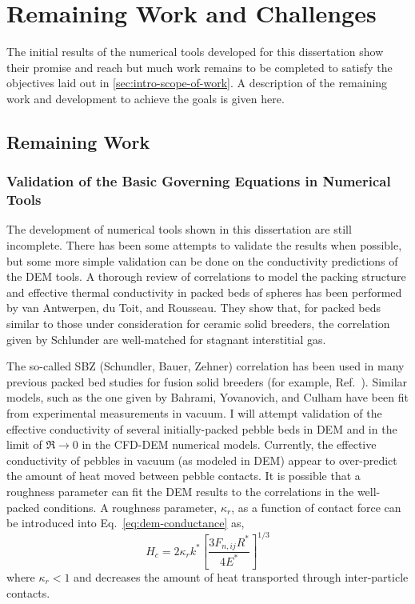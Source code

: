 \chapter{Remaining Work and Challenges}\label{sec:remaining}

The initial results of the numerical tools developed for this dissertation show their promise and reach but much work remains to be completed to satisfy the objectives laid out in \cref{sec:intro-scope-of-work}. A description of the remaining work and development to achieve the goals is given here. 

\section{Remaining Work}
\subsection{Validation of the Basic Governing Equations in Numerical Tools}

The development of numerical tools shown in this dissertation are still incomplete. There has been some attempts to validate the results when possible, but some more simple validation can be done on the conductivity predictions of the DEM tools. A thorough review of correlations to model the packing structure and effective thermal conductivity in packed beds of spheres has been performed by van Antwerpen, du Toit, and Rousseau.\cite{VanAntwerpen2010} They show that, for packed beds similar to those under consideration for ceramic solid breeders, the correlation given by Schlunder\etal\cite{bauer1978effective,Zehner1972} are well-matched for stagnant interstitial gas. 

The so-called SBZ (Schundler, Bauer, Zehner) correlation has been used in many previous packed bed studies for fusion solid breeders (for example, Ref.~\cite{Abou-Sena:2007ff}). Similar models, such as the one given by Bahrami, Yovanovich, and Culham have been fit from experimental measurements in vacuum.\cite{Bahrami20063691} I will attempt validation of the effective conductivity of several initially-packed pebble beds in DEM and in the limit of $\Re \rightarrow 0$ in the CFD-DEM numerical models. Currently, the effective conductivity of pebbles in vacuum (as modeled in DEM) appear to over-predict the amount of heat moved between pebble contacts. It is possible that a roughness parameter can fit the DEM results to the correlations in the well-packed conditions. A roughness parameter, $\kappa_r$, as a function of contact force can be introduced into Eq.~\ref{eq:dem-conductance} as,
\begin{equation}
	H_c = 2\kappa_rk^*\left[\frac{3F_{n,ij}R^*}{4E^*}\right]^{1/3}
\end{equation}
where $\kappa_r < 1$ and decreases the amount of heat transported through inter-particle contacts.

